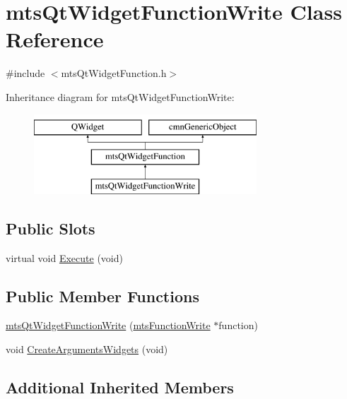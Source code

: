 \hypertarget{classmts_qt_widget_function_write}{\section{mts\-Qt\-Widget\-Function\-Write Class Reference}
\label{classmts_qt_widget_function_write}
}


{\ttfamily \#include $<$mts\-Qt\-Widget\-Function.\-h$>$}

Inheritance diagram for mts\-Qt\-Widget\-Function\-Write\-:\begin{figure}[H]
\begin{center}
\leavevmode
\includegraphics[height=3.000000cm]{d0/d67/classmts_qt_widget_function_write}
\end{center}
\end{figure}
\subsection*{Public Slots}
\begin{DoxyCompactItemize}
\item 
virtual void \hyperlink{classmts_qt_widget_function_write_a1991ced763293df591315da0b3f43c59}{Execute} (void)
\end{DoxyCompactItemize}
\subsection*{Public Member Functions}
\begin{DoxyCompactItemize}
\item 
\hyperlink{classmts_qt_widget_function_write_a9f931456c21e0e55a0f169bf51600fa5}{mts\-Qt\-Widget\-Function\-Write} (\hyperlink{classmts_function_write}{mts\-Function\-Write} $\ast$function)
\item 
void \hyperlink{classmts_qt_widget_function_write_af29a8e53ccc8db0705d4e2f68198ff59}{Create\-Arguments\-Widgets} (void)
\end{DoxyCompactItemize}
\subsection*{Additional Inherited Members}


